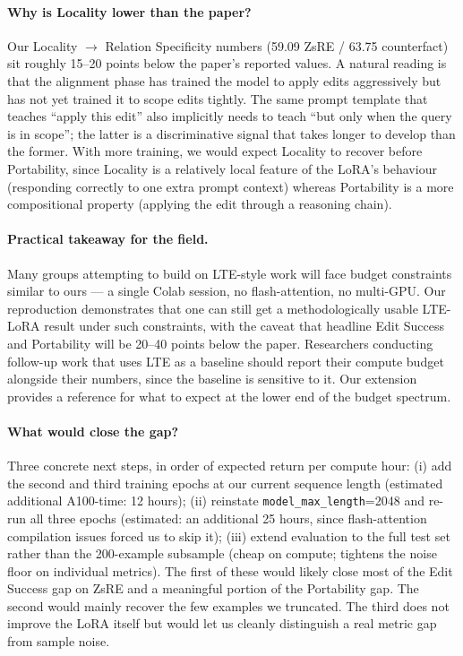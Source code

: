 \documentclass[11pt,a4paper,twocolumn]{article}
\begin{document}
\paragraph{Why is Locality lower than the paper?} Our Locality $\rightarrow$ Relation Specificity numbers (59.09 ZsRE / 63.75 counterfact) sit roughly 15--20 points below the paper's reported values. A natural reading is that the alignment phase has trained the model to apply edits aggressively but has not yet trained it to scope edits tightly. The same prompt template that teaches ``apply this edit'' also implicitly needs to teach ``but only when the query is in scope''; the latter is a discriminative signal that takes longer to develop than the former. With more training, we would expect Locality to recover before Portability, since Locality is a relatively local feature of the LoRA's behaviour (responding correctly to one extra prompt context) whereas Portability is a more compositional property (applying the edit through a reasoning chain).

\paragraph{Practical takeaway for the field.} Many groups attempting to build on LTE-style work will face budget constraints similar to ours --- a single Colab session, no flash-attention, no multi-GPU. Our reproduction demonstrates that one can still get a methodologically usable LTE-LoRA result under such constraints, with the caveat that headline Edit Success and Portability will be 20--40 points below the paper. Researchers conducting follow-up work that uses LTE as a baseline should report their compute budget alongside their numbers, since the baseline is sensitive to it. Our extension provides a reference for what to expect at the lower end of the budget spectrum.

\paragraph{What would close the gap?} Three concrete next steps, in order of expected return per compute hour: (i) add the second and third training epochs at our current sequence length (estimated additional A100-time: 12 hours); (ii) reinstate \texttt{model\_max\_length}=2048 and re-run all three epochs (estimated: an additional 25 hours, since flash-attention compilation issues forced us to skip it); (iii) extend evaluation to the full test set rather than the 200-example subsample (cheap on compute; tightens the noise floor on individual metrics). The first of these would likely close most of the Edit Success gap on ZsRE and a meaningful portion of the Portability gap. The second would mainly recover the few examples we truncated. The third does not improve the LoRA itself but would let us cleanly distinguish a real metric gap from sample noise.
\end{document}
